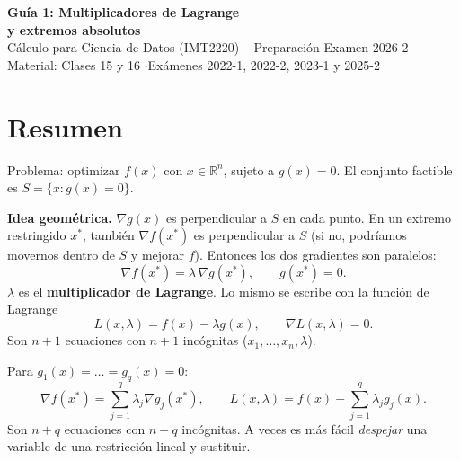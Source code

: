 \documentclass[11pt,a4paper]{article}
\newcommand{\R}{\mathbb{R}}
\begin{document}
\begin{center}
{\LARGE\bfseries Guía 1: Multiplicadores de Lagrange\\[2pt] y extremos absolutos}\\[6pt]
{\large Cálculo para Ciencia de Datos (IMT2220) -- Preparación Examen 2026-2}\\[3pt]
{\small Material: Clases 15 y 16 \quad$\cdot$\quad Exámenes 2022-1, 2022-2, 2023-1 y 2025-2}
\end{center}

\section{Resumen}

\begin{resumen}
Problema: optimizar $f(x)$ con $x\in\R^n$, sujeto a $g(x)=0$. El conjunto factible es $S=\{x : g(x)=0\}$.

\textbf{Idea geométrica.} $\nabla g(x)$ es perpendicular a $S$ en cada punto. En un extremo restringido $x^*$, también $\nabla f(x^*)$ es perpendicular a $S$ (si no, podríamos movernos dentro de $S$ y mejorar $f$). Entonces los dos gradientes son paralelos:
\[
\boxed{\nabla f(x^*) = \lambda\,\nabla g(x^*),\qquad g(x^*)=0.}
\]
$\lambda$ es el \textbf{multiplicador de Lagrange}. Lo mismo se escribe con la función de Lagrange
\[
L(x,\lambda)=f(x)-\lambda g(x),\qquad \nabla L(x,\lambda)=0 .
\]
Son $n+1$ ecuaciones con $n+1$ incógnitas ($x_1,\dots,x_n,\lambda$).
\end{resumen}

\begin{resumen}
Para $g_1(x)=\dots=g_q(x)=0$:
\[
\nabla f(x^*)=\sum_{j=1}^q \lambda_j\nabla g_j(x^*),\qquad L(x,\lambda)=f(x)-\sum_{j=1}^q\lambda_j g_j(x).
\]
Son $n+q$ ecuaciones con $n+q$ incógnitas. A veces es más fácil \emph{despejar} una variable de una restricción lineal y sustituir.
\end{resumen}
\end{document}
